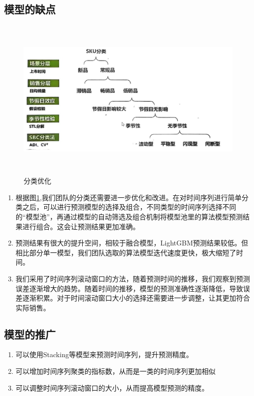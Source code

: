 \documentclass[withoutpreface,bwprint]{cumcmthesis}
\begin{document}
\subsection{模型的缺点}
     \begin{figure}[htbp]
     \centering
     \includegraphics[width=15cm,height=8cm]{figure/更好的分类.jpg}%
     \caption{分类优化}
     \label{分类优化}
    \end{figure}
\begin{enumerate}
    \item 根据图\ref{分类优化},我们团队的分类还需要进一步优化和改进。在对时间序列进行简单分类之后，可以进行预测模型的选择及组合，不同类型的时间序列选择不同的“模型池”，再通过模型的自动筛选及组合机制将模型池里的算法模型预测结果进行组合。这会让预测结果更加准确。
	\item 预测结果有很大的提升空间，相较于融合模型，LightGBM预测结果较低。但相比部分单一模型，我们团队选取的算法模型迭代速度更快，极大缩短了时间。
    \item 我们采用了时间序列滚动窗口的方法，随着预测时间的推移，我们观察到预测误差逐渐增大的趋势。随着时间的推移，模型的预测准确性逐渐降低，导致误差逐渐积累。对于时间滚动窗口大小的选择还需要进一步调整，让其更加符合实际销售。
\end{enumerate}
\subsection{模型的推广}
\begin{enumerate}
	\item 可以使用Stacking等模型来预测时间序列，提升预测精度。
    \item 可以增加时间序列聚类的指标数，从而是一类的时间序列更加相似
    \item 可以调整时间序列滚动窗口的大小，从而提高模型预测的精度。
\end{enumerate}
  
\end{document}
